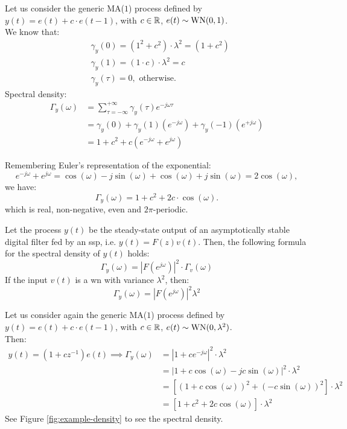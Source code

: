 \begin{example}
Let us consider the generic MA($1$) process defined by $y(t)=e(t)+c \cdot e(t-1)$, with $c \in \mathbb{R}$, $e(t)\sim \operatorname{WN}(0,1)$.\\
We know that:
\begin{align*}
	&\gamma_{y}(0)=(1^{2}+c^{2})\cdot \lambda^{2}=(1+c^{2})\\
	&\gamma_{y}(1)=(1 \cdot c) \cdot \lambda^{2}=c \\
	&\gamma_{y}(\tau)=0, \text{ otherwise.}
\end{align*}
Spectral density:
\begin{align*}
	\Gamma_{y}(\omega)&=\sum_{\tau=-\infty}^{+\infty} \gamma_{y}(\tau) e^{-j \omega \tau}\\
	&=\gamma_{y}(0)+\gamma_{y}(1)(e^{-j \omega})+\gamma_{y}(-1)(e^{+j \omega}) \\
	&=1+c^{2}+c(e^{-j \omega}+e^{j \omega})
\end{align*}

Remembering Euler's representation of the exponential:
$$
	e^{-j \omega}+e^{j \omega}=\cos (\omega)-j \sin (\omega)+\cos (\omega)+j \sin (\omega)=2 \cos (\omega),
$$
we have:
$$
	\Gamma_y(\omega)=1+c^{2}+2 c \cdot \cos (\omega).
$$
which is real, non-negative, even and $2 \pi$-periodic.
\end{example}
Let the process $y(t)$ be the steady-state output of an asymptotically stable digital filter fed by an \gls{ssp}, i.e. $y(t)=F(z) v(t)$. Then, the following formula for the spectral density of $y(t)$ holds:
\[
	\boxed{\Gamma_{y}(\omega)=|F(e^{j \omega})|^{2} \cdot \Gamma_{v}(\omega)}
\]
If the input $v(t)$ is a \gls{wn} with variance $\lambda^{2}$, then:
$$
\Gamma_{y}(\omega)=|F(e^{j \omega})|^{2} \lambda^{2}
$$

Let us consider again the generic MA($1$) process defined by $y(t)=e(t)+c \cdot e(t-1)$, with $c \in \mathbb{R}$, $e(t)\sim \operatorname{WN}(0,\lambda^2)$.\\
Then:
\begin{align*}
	y(t)=\left(1+c z^{-1}\right) e(t) \implies \Gamma_{y}(\omega)&=\left|1+c e^{-j \omega}\right|^{2} \cdot \lambda^{2}\\
	&=\left|1+c \cos (\omega)-j c\sin (\omega)\right|^{2}\cdot\lambda^2\\
	&=[\left(1+c \cos (\omega)\right)^2+\left(-c\sin (\omega)\right)^2]\cdot\lambda^2\\
	&=[1+c^{2}+2 c \cos (\omega)]\cdot\lambda^2
\end{align*}
See Figure \ref{fig:example-density} to see the spectral density.

